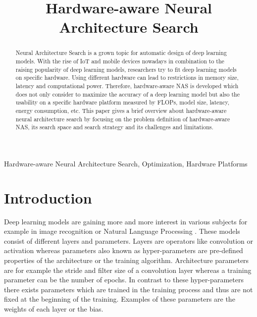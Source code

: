 \documentclass[conference]{IEEEtran}
\begin{document}
\title{Hardware-aware Neural Architecture Search\\}

\author{
}

\maketitle

\begin{abstract}
Neural Architecture Search is a grown topic for automatic design of deep learning models. With the rise of IoT and mobile devices nowadays in combination to the raising popularity of deep learning models, researchers try to fit deep learning models on specific hardware. Using different hardware can lead to restrictions in memory size, latency and computational power. Therefore, hardware-aware NAS is developed which does not only consider to maximize the accuracy of a deep learning model but also the usability on a specific hardware platform measured by FLOPs, model size, latency, energy consumption, etc. This paper gives a brief overview about hardware-aware neural architecture search by focusing on the problem definition of hardware-aware NAS, its search space and search strategy and its challenges and limitations.  
\end{abstract}

\begin{IEEEkeywords}
Hardware-aware Neural Architecture Search, Optimization, Hardware Platforms
\end{IEEEkeywords}

\section{Introduction}
\label{section:Introduction}
Deep learning models are gaining more and more interest in various subjects for example in image recognition \cite{bib2} or Natural Language Processing \cite{bib3}. These models consist of different layers and parameters. Layers are operators like convolution or activation whereas parameters also known as hyper-parameters are pre-defined properties of the architecture or the training algorithm. Architecture parameters are for example the stride and filter size of a convolution layer whereas a training parameter can be the number of epochs. In contrast to these hyper-parameters there exists parameters which are trained in the training process and thus are not fixed at the beginning of the training. Examples of these parameters are the weights of each layer or the bias. 
\end{document}
